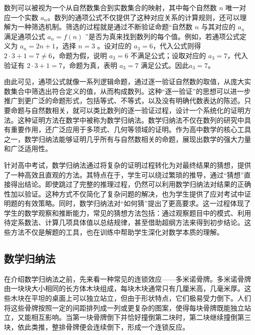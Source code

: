 
\begin{issues}
\issueDraft
\end{issues}


数列可以被视为一个从自然数集合到实数集合的映射，其中每个自然数 $n$ 唯一对应一个实数 $a_n$。数列的通项公式不仅提供了这种对应关系的计算规则，还可以理解为一种筛选机制。筛选的过程就是通过不断验证命题“自然数 $n$ 与其对应的 $a_n$满足通项公式 $a_n = f(n)$ ”是否为真来找到数列的每个值。例如，若通项公式定义为 $a_n = 2n + 1$，选择 $n = 3$ 。设对应的 $a_3 = 6$，代入公式则得 $2 \cdot 3 + 1 = 7 \neq 6$，命题为假，说明 $a_3 = 6$ 不满足公式；设取对应的 $a_3 = 7$，代入验证有 $2 \cdot 3 + 1 = 7$，命题为真，表明 $a_3 = 7$ 满足公式。因此$a_3=7$。

由此可见，通项公式就像一系列逻辑命题，通过逐一验证自然数的取值，从庞大实数集合中筛选出符合定义的值，从而构成数列。这种“逐一验证”的思想可以进一步推广到更广泛的命题形式，包括等式、不等式，以及没有明确代数表达的陈述。只要命题与自然数相关，就可以类比数列的逐一验证过程，设计一个系统化的证明方法。这种证明方法在数学中被称为数学归纳法。数学归纳法不仅在数列的研究中具有重要作用，还广泛应用于多项式、几何等领域的证明。作为高中数学的核心工具之一，数学归纳法能够证明几乎所有与自然数相关的命题，展现出数学的强大力量和广泛适用性。

针对高中考试，数学归纳法通过将复杂的证明过程转化为对最终结果的猜想，提供了一种高效且直观的方法。其特点在于，学生可以绕过繁琐的推导，通过“猜想”直接得出结论。即使跳过了完整的推理过程，仍然可以利用数学归纳法对结果的正确性加以验证。这种方式不仅简化了复杂问题的解决，也为学生提供了应对考试中证明题的有效策略。同时，数学归纳法对“如何猜”提出了更高要求。这一过程体现了学生的数学观察和推断能力，常见的猜想方法包括：通过观察题目中的模式、利用待定系数法、计算几项具体值以总结规律，甚至借助超纲方法来得到初步结论。这些方法不仅是解题的工具，也在训练中帮助学生深化对数学本质的理解。

\subsection{数学归纳法}

在介绍数学归纳法之前，先来看一种常见的连锁效应——多米诺骨牌。多米诺骨牌由一块块大小相同的长方体木块组成，每块木块通常只有几厘米高，几毫米厚。这些木块在平坦的桌面上可以独立站立，但由于形状特点，它们极易受力倒下。人们将这些骨牌按照一定的间距排列成一列或更复杂的图案，使得每块骨牌既能独立站立，又能相互影响。当第一块骨牌倒下并恰好撞倒第二块时，第二块继续撞倒第三块，依此类推，整排骨牌便会连续倒下，形成一个连锁反应。

